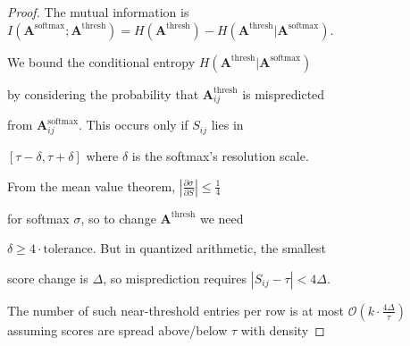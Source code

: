 \begin{proof}






The mutual information is $I(\mathbf{A}^{\text{softmax}}; \mathbf{A}^{\text{thresh}}) = 






H(\mathbf{A}^{\text{thresh}}) - H(\mathbf{A}^{\text{thresh}} | \mathbf{A}^{\text{softmax}})$.






We bound the conditional entropy $H(\mathbf{A}^{\text{thresh}} | \mathbf{A}^{\text{softmax}})$






by considering the probability that $\mathbf{A}^{\text{thresh}}_{ij}$ is mispredicted






from $\mathbf{A}^{\text{softmax}}_{ij}$. This occurs only if $S_{ij}$ lies in






$[\tau - \delta, \tau + \delta]$ where $\delta$ is the softmax's resolution scale.






From the mean value theorem, $\left| \frac{\partial \sigma}{\partial S} \right| \leq \frac{1}{4}$






for softmax $\sigma$, so to change $\mathbf{A}^{\text{thresh}}$ we need






$\delta \geq 4 \cdot \text{tolerance}$. But in quantized arithmetic, the smallest






score change is $\Delta$, so misprediction requires $|S_{ij} - \tau| < 4\Delta$.






The number of such near-threshold entries per row is at most $\mathcal{O}(k \cdot






\frac{4\Delta}{\tau})$ assuming scores are spread above/below $\tau$ with density







\end{proof}
